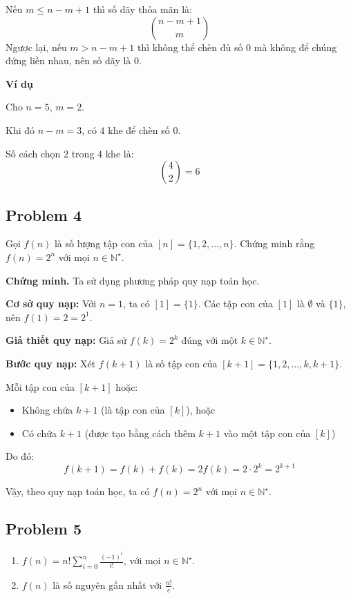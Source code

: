 \documentclass{article}
\begin{document}
	Nếu $m \leq n - m + 1$ thì số dãy thỏa mãn là:
	\[
	\boxed{
		\binom{n - m + 1}{m}
	}
	\]
	Ngược lại, nếu $m > n - m + 1$ thì không thể chèn đủ số $0$ mà không để chúng đứng liền nhau, nên số dãy là $0$.
	
	\textbf{Ví dụ}
	
	Cho $n = 5$, $m = 2$.
	
	Khi đó $n - m = 3$, có $4$ khe để chèn số $0$.
	
	Số cách chọn $2$ trong $4$ khe là:
	\[
	\binom{4}{2} = 6
	\]
	
	\subsection*{Problem 4}
	Gọi $f(n)$ là số lượng tập con của $[n] = \{1, 2, \dots, n\}$. Chứng minh rằng $f(n) = 2^n$ với mọi $n \in \mathbb{N}^\star$.
	
	\textbf{Chứng minh.} Ta sử dụng phương pháp quy nạp toán học.
	
	\textbf{Cơ sở quy nạp:} Với $n = 1$, ta có $[1] = \{1\}$. Các tập con của $[1]$ là $\emptyset$ và $\{1\}$, nên $f(1) = 2 = 2^1$.
	
	\textbf{Giả thiết quy nạp:} Giả sử $f(k) = 2^k$ đúng với một $k \in \mathbb{N}^\star$.
	
	\textbf{Bước quy nạp:} Xét $f(k+1)$ là số tập con của $[k+1] = \{1, 2, \dots, k, k+1\}$.
	
	Mỗi tập con của $[k+1]$ hoặc:
	\begin{itemize}
		\item Không chứa $k+1$ (là tập con của $[k]$), hoặc
		\item Có chứa $k+1$ (được tạo bằng cách thêm $k+1$ vào một tập con của $[k]$)
	\end{itemize}
	
	Do đó:
	\[
	f(k+1) = f(k) + f(k) = 2f(k) = 2 \cdot 2^k = 2^{k+1}
	\]
	
	Vậy, theo quy nạp toán học, ta có $f(n) = 2^n$ với mọi $n \in \mathbb{N}^\star$.
	
	\subsection*{Problem 5}
	\begin{enumerate}[label=(\alph*)]
		\item \( f(n) = n! \sum_{i=0}^{n} \frac{(-1)^i}{i!} \), với mọi $n \in \mathbb{N}^\star$.
		\item \( f(n) \) là số nguyên gần nhất với \( \frac{n!}{e} \).
	\end{enumerate}
	
\end{document}
